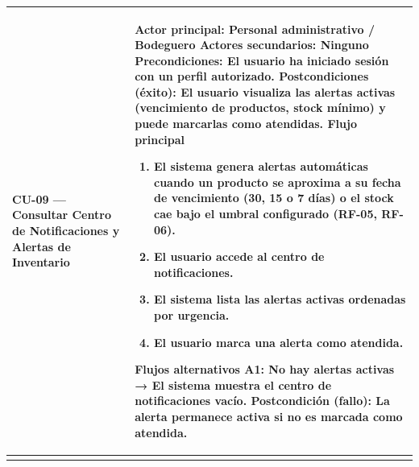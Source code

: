 \documentclass[
]{article}
\newcounter{none} %
\begin{document}
{\def\LTcaptype{none} %
\begin{longtable}[]{|
  >{\raggedright\arraybackslash}p{}|
  >{\raggedright\arraybackslash}p{}|}
\hline
\begin{minipage}[b]{\linewidth}\raggedright
\textbf{CU-09 --- Consultar Centro de Notificaciones y Alertas de Inventario}
\end{minipage} & \begin{minipage}[b]{\linewidth}\raggedright
\textbf{Actor principal:} Personal administrativo / Bodeguero
\textbf{Actores secundarios:} Ninguno \textbf{Precondiciones:} El
usuario ha iniciado sesión con un perfil autorizado. \textbf{Postcondiciones (éxito):} El usuario visualiza las alertas
activas (vencimiento de productos, stock mínimo) y puede marcarlas como
atendidas. \textbf{Flujo principal}

\begin{enumerate}
\def\labelenumi{\arabic{enumi}.}
\item
  El sistema genera alertas automáticas cuando un producto se aproxima a
  su fecha de vencimiento (30, 15 o 7 días) o el stock cae bajo el
  umbral configurado (RF-05, RF-06).
\item
  El usuario accede al centro de notificaciones.
\item
  El sistema lista las alertas activas ordenadas por urgencia.
\item
  El usuario marca una alerta como atendida.
\end{enumerate}

\textbf{Flujos alternativos} A1: No hay alertas activas → El sistema muestra el centro de
notificaciones vacío. \textbf{Postcondición (fallo):} La alerta permanece activa si no es
marcada como atendida.
\end{minipage} \\
\hline
\endhead
\hline
\endlastfoot
\end{longtable}
}
\end{document}

